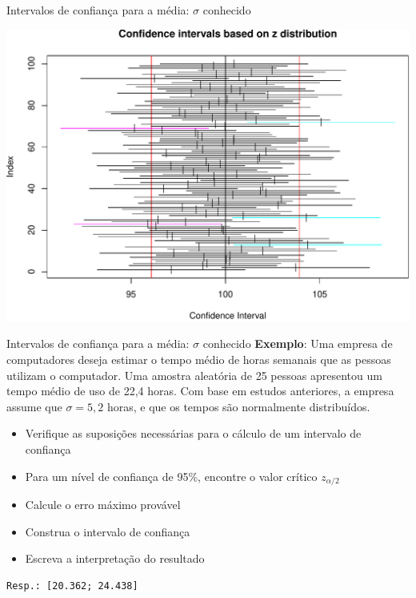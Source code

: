\documentclass[10pt]{beamer}\usepackage[]{graphicx}\usepackage[]{color}
\makeatletter
\newenvironment{kframe}{%
 \def\at@end@of@kframe{}%
 \ifinner\ifhmode%
  \def\at@end@of@kframe{\end{minipage}}%
  \begin{minipage}{\columnwidth}%
 \fi\fi%
 \def\FrameCommand##1{\hskip\@totalleftmargin \hskip-\fboxsep
 \colorbox{shadecolor}{##1}\hskip-\fboxsep
     \hskip-\linewidth \hskip-\@totalleftmargin \hskip\columnwidth}%
 \MakeFramed {\advance\hsize-\width
   \@totalleftmargin\z@ \linewidth\hsize
   \@setminipage}}%
 {\par\unskip\endMakeFramed%
 \at@end@of@kframe}
\newenvironment{knitrout}{}{} %
\theoremstyle{definition}
\makeatother
\begin{document}
\begin{frame}{Intervalos de confiança para a média: $\sigma$ conhecido}
\begin{knitrout}\footnotesize
{}\color{fgcolor}

{\centering \includegraphics[width=1\textwidth]{figure/unnamed-chunk-1-1} 

}



\end{knitrout}
\end{frame}

\begin{frame}[fragile]{Intervalos de confiança para a média: $\sigma$ conhecido}
  \textbf{Exemplo}: Uma empresa de computadores deseja estimar o tempo médio de
  horas semanais que as pessoas utilizam o computador. Uma amostra
  aleatória de 25 pessoas apresentou um tempo médio
  de uso de 22,4 horas. Com base em estudos anteriores, a empresa assume
  que $\sigma = 5,2$ horas, e que os tempos são normalmente
  distribuídos.
  \begin{itemize}
  \item[a)] Verifique as suposições necessárias para o cálculo de
    um intervalo de confiança
  \item[b)] Para um nível de confiança de 95\%, encontre o valor crítico
    $z_{\alpha/2}$
  \item[c)] Calcule o erro máximo provável
  \item[d)] Construa o intervalo de confiança
  \item[e)] Escreva a interpretação do resultado
  \end{itemize}
\begin{knitrout}\footnotesize
{}\color{fgcolor}\begin{kframe}
\begin{verbatim}
Resp.: [20.362; 24.438]
\end{verbatim}
\end{kframe}
\end{knitrout}
\end{frame}
\end{document}
